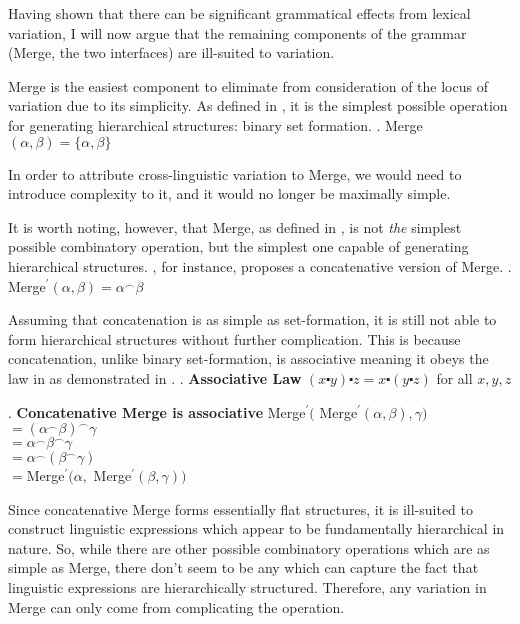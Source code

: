 \documentclass[MilwayThesis]{subfiles}
\begin{document}
Having shown that there can be significant grammatical effects from lexical variation, I will now argue that the remaining components of the grammar (Merge, the two interfaces) are ill-suited to variation.

Merge is the easiest component to eliminate from consideration of the locus of variation due to its simplicity.
As defined in \Next, it is the simplest possible operation for generating hierarchical structures: binary set formation.
\ex. Merge$(\alpha, \beta) = \{ \alpha, \beta\}$

In order to attribute cross-linguistic variation to Merge, we would need to introduce complexity to it, and it would no longer be maximally simple.

It is worth noting, however, that Merge, as defined in \Last, is not \textit{the} simplest possible combinatory operation, but the simplest one capable of generating hierarchical structures.
\textcite{hornstein2009theory}, for instance, proposes a concatenative version of Merge.
\ex. Merge$^\prime(\alpha, \beta) = \alpha^\frown\beta$

Assuming that concatenation is as simple as set-formation, it is still not able to form hierarchical structures without further complication.
This is because concatenation, unlike binary set-formation, is associative meaning it obeys the law in \Next as demonstrated in \NNext.
\ex. \textbf{Associative Law}
$(x \centerdot y) \centerdot z = x \centerdot (y \centerdot z)$ for all $x,y,z$

\ex. \textbf{Concatenative Merge is associative}
Merge$^\prime($ Merge$^\prime(\alpha, \beta), \gamma)$\\
$= (\alpha^\frown\beta)^\frown\gamma$\\
$= \alpha^\frown\beta^\frown\gamma$\\
$= \alpha^\frown(\beta^\frown\gamma)$\\
$= $Merge$^\prime(\alpha, $ Merge$^\prime(\beta, \gamma))$

Since concatenative Merge forms essentially flat structures, it is ill-suited to construct linguistic expressions which appear to be fundamentally hierarchical in nature.
So, while there are other possible combinatory operations which are as simple as Merge, there don't seem to be any which can capture the fact that linguistic expressions are hierarchically structured.
Therefore, any variation in Merge can only come from complicating the operation.
\end{document}
